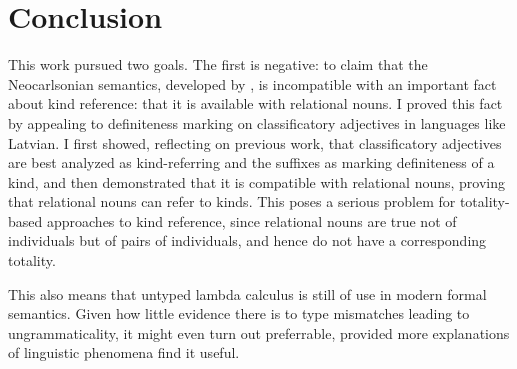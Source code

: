 \documentclass[a4paper, 12pt]{article}
\begin{document}





\section{Conclusion}\label{conc}

This work pursued two goals. The first is negative: to claim that the Neocarlsonian semantics, developed by \textcite{chierchia1998referencekindslanguages}, is incompatible with an important fact about kind reference: that it is available with relational nouns. I proved this fact by appealing to definiteness marking on classificatory adjectives in languages like Latvian. I first showed, reflecting on previous work, that classificatory adjectives are best analyzed as kind-referring and the suffixes as marking definiteness of a kind, and then demonstrated that it is compatible with relational nouns, proving that relational nouns can refer to kinds. This poses a serious problem for totality-based approaches to kind reference, since relational nouns are true not of individuals but of pairs of individuals, and hence do not have a corresponding totality.

This also means that untyped lambda calculus is still of use in modern formal semantics. Given how little evidence there is to type mismatches leading to ungrammaticality, it might even turn out preferrable, provided more explanations of linguistic phenomena find it useful.
\end{document}
